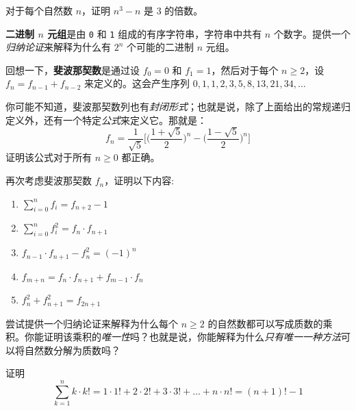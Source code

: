 \begin{exercise}
    对于每个自然数 $n$，证明 $n^3 - n$ 是 3 的倍数。
\end{exercise}

\begin{exercise}
    \textbf{二进制 $n$ 元组}是由 \verb|0| 和 \verb|1| 组成的有序字符串，字符串中共有 $n$ 个数字。提供一个\emph{归纳论证}来解释为什么有 $2^n$ 个可能的二进制 $n$ 元组。
\end{exercise}

\begin{exercise}
    回想一下，\textbf{斐波那契数}是通过设 $f_0 = 0$ 和 $f_1 = 1$，然后对于每个 $n \ge 2$，设 $f_n = f_{n-1} + f_{n-2}$ 来定义的。这会产生序列 $0, 1, 1, 2, 3, 5, 8, 13, 21, 34, \dots$

    你可能不知道，斐波那契数列也有\emph{封闭形式}；也就是说，除了上面给出的常规递归定义外，还有一个特定\emph{公式}来定义它。那就是：
    \[f_n = \frac{1}{\sqrt 5}\Bigg[\Bigg(\frac{1+\sqrt 5}{2}\Bigg)^n - \Bigg(\frac{1-\sqrt 5}{2}\Bigg)^n\Bigg]\]
    证明该公式对于所有 $n \ge 0$ 都正确。
\end{exercise}

\begin{exercise}
    再次考虑斐波那契数 $f_n$，证明以下内容:
    \begin{enumerate}
        \item $\displaystyle{\sum_{i=0}^{n}f_i = f_{n+2} - 1}$
        \item $\displaystyle{\sum_{i=0}^{n}f_i^2 = f_n \cdot f_{n+1}}$
        \item $\displaystyle{f_{n-1} \cdot f_{n+1} - f_n^2 = (-1)^n}$
        \item $\displaystyle{f_{m+n} = f_n \cdot f_{n+1} + f_{m-1} \cdot f_n}$
        \item $\displaystyle{f_n^2 + f_{n+1}^2 = f_{2n+1}}$
    \end{enumerate}
\end{exercise}

\begin{exercise}
    尝试提供一个归纳论证来解释为什么每个 $n ≥ 2$ 的自然数都可以写成质数的乘积。你能证明该乘积的\emph{唯一性}吗？也就是说，你能解释为什么\emph{只有唯一一种方法}可以将自然数分解为质数吗？
\end{exercise}

\begin{exercise}
    证明
    \[\sum_{k=1}^{n} k \cdot k! = 1 \cdot 1! + 2 \cdot 2! + 3 \cdot 3! + \dots + n \cdot n! = (n+1)!-1\]
\end{exercise}

